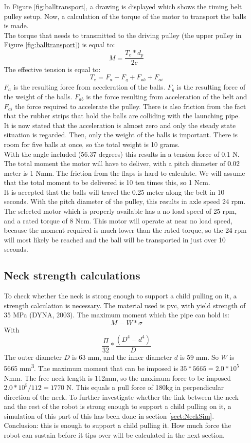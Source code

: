 \documentclass[11pt,twoside,a4paper]{report}
\begin{document}
In Figure \ref{fig:balltransport}, a drawing is displayed which shows the timing belt pulley setup. Now, a calculation of the torque of the motor to transport the balls is made.\\

The torque that needs to transmitted to the driving pulley (the upper pulley in Figure \ref{fig:balltransport}) is equal to: \[M=\frac{T_{e}*d_{p}}{2c}  \]
The effective tension is equal to:
\[T_{e}=F_{a}+F_{g}+F_{ab}+F_{ai}  \]
$F_{a}$ is the resulting force from acceleration of the balls. $F_{g}$ is the resulting force of the weight of the balls. $F_{ab}$ is the force resulting from acceleration of the belt and $F_{­ai}$ the force required to accelerate the pulley. There is also friction from the fact that the rubber strips that hold the balls are colliding with the launching pipe.\\
It is now stated that the acceleration is almost zero and only the steady state situation is regarded. Then, only the weight of the balls is important. There is room for five balls at once, so the total weight is 10 grams. \\
With the angle included (56.37 degrees) this results in a tension force of 0.1 N. The total moment the motor will have to deliver, with a pitch diameter of 0.02 meter is 1 Nmm. The friction from the flaps is hard to calculate. We will assume that the total moment to be delivered is 10 ten times this, so 1 Ncm. \\
It is accepted that the balls will travel the 0.25 meter along the belt in 10 seconds. With the pitch diameter of the pulley, this results in axle speed 24 rpm. The selected motor which is properly available has a no load speed of 25 rpm, and a rated torque of 8 Ncm. This motor will operate at near no load speed, because the moment required is much lower than the rated torque, so the 24 rpm will most likely be reached and the ball will be transported in just over 10 seconds. 
\subsection{Neck strength calculations}
To check whether the neck is strong enough to support a child pulling on it, a strength calculation is necessary. The material used is pvc, with yield strength of 35 MPa (DYNA, 2003).
The maximum moment which the pipe can hold is:
\[M=W*\sigma\]
With
\[\frac{\Pi}{32}*\frac{(D^{4}-d^{4})}{D}\]
The outer diameter $D$ is 63 mm, and the inner diameter $d$ is 59 mm. So $W$ is 5665 mm\textsuperscript{3}. The maximum moment that can be imposed is $35*5665= 2.0*10^5$ Nmm. 
The free neck length is 112mm, so the maximum force to be imposed $2.0*10^5/112 = 1770$ N. This equals a pull force of 180kg in perpendicular direction of the neck. To further investigate whether the link between the neck and the rest of the robot is strong enough to support a child pulling on it, a simulation of this part of this has been done in section \ref{sect:NeckSim}.
Conclusion: this is enough to support a child pulling it. How much force the robot can sustain before it tips over will be calculated in  the next section. 
\end{document}
